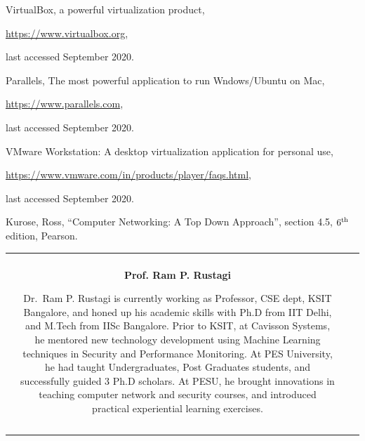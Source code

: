 \begin{multicols}{2}
\begin{thebibliography}{99}
 VirtualBox, a powerful virtualization product,

\url{https://www.virtualbox.org},

last accessed September 2020.

 Parallels, The most powerful application to run Wndows/Ubuntu on Mac,

\url{https://www.parallels.com},

last accessed September 2020.

 VMware Workstation: A desktop virtualization application for personal use,

\url{https://www.vmware.com/in/products/player/faqs.html},

last accessed September 2020.

 Kurose, Ross, “Computer Networking: A Top Down Approach”, section 4.5, $6^{\rm th}$ edition, Pearson.

\end{thebibliography}

\end{multicols}


\noindent
\begin{tabular}{V{2.5}cp{14.2cm}V{2.5}}
 &\\
 & 

\centerline{\large\bf Prof. Ram P. Rustagi}

\bigskip
Dr.~Ram P. Rustagi is currently working as Professor, CSE dept, KSIT Bangalore, and honed up his academic skills with Ph.D from IIT Delhi, and M.Tech from IISc Bangalore. Prior to KSIT, at Cavisson Systems, he mentored new technology development using Machine Learning techniques in Security and Performance Monitoring. At PES University, he had taught Undergraduates, Post Graduates students, and successfully guided 3 Ph.D scholars. At PESU, he brought innovations in teaching computer network and security courses, and introduced practical experiential learning exercises.\\
&\\ 
\end{tabular}
